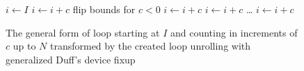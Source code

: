 \begin{figure}[H]
    \centering
    \begin{algorithmic}
        \State $i \gets I$
                \State {} 
                \State $i \gets i + c$ 
            \EndWhile
        \EndIf
             \Comment flip bounds for $c < 0$
                \State {}
                \State $i \gets i + c$
            \EndCase
                \State {}
                \State $i \gets i + c$
            \EndCase
            \State
            \ldots
                \State {}
                \State $i \gets i + c$
            \EndCase
        \EndSwitch
        \EndFunction
    \end{algorithmic}
    \caption{The general form of loop starting at $I$ and counting in increments of $c$ up to $N$ transformed by the created loop unrolling with generalized Duff's device fixup}
    \label{fig:impl:fixup:duff:general-loop}
\end{figure}